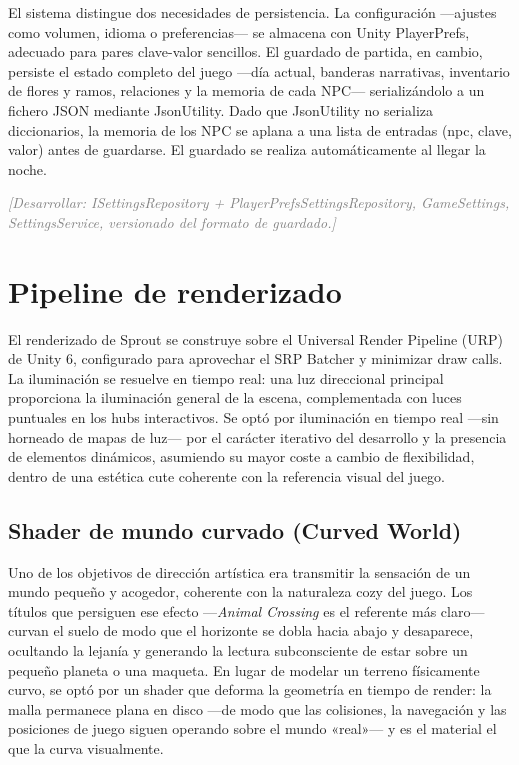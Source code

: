 \documentclass[12pt,twoside,titlepage]{report}
\begin{document}
El sistema distingue dos necesidades de persistencia. La configuración ---ajustes como volumen, idioma o preferencias--- se almacena con Unity PlayerPrefs, adecuado para pares clave-valor sencillos. El guardado de partida, en cambio, persiste el estado completo del juego ---día actual, banderas narrativas, inventario de flores y ramos, relaciones y la memoria de cada NPC--- serializándolo a un fichero JSON mediante JsonUtility. Dado que JsonUtility no serializa diccionarios, la memoria de los NPC se aplana a una lista de entradas (npc, clave, valor) antes de guardarse. El guardado se realiza automáticamente al llegar la noche.

\textcolor{gray}{\textit{[Desarrollar: ISettingsRepository + PlayerPrefsSettingsRepository, GameSettings, SettingsService, versionado del formato de guardado.]}}

\section{Pipeline de renderizado}

El renderizado de Sprout se construye sobre el Universal Render Pipeline (URP) de Unity 6, configurado para aprovechar el SRP Batcher y minimizar draw calls. La iluminación se resuelve en tiempo real: una luz direccional principal proporciona la iluminación general de la escena, complementada con luces puntuales en los hubs interactivos. Se optó por iluminación en tiempo real ---sin horneado de mapas de luz--- por el carácter iterativo del desarrollo y la presencia de elementos dinámicos, asumiendo su mayor coste a cambio de flexibilidad, dentro de una estética cute coherente con la referencia visual del juego.

\subsection{Shader de mundo curvado (Curved World)}

Uno de los objetivos de dirección artística era transmitir la sensación de un mundo pequeño y acogedor, coherente con la naturaleza cozy del juego. Los títulos que persiguen ese efecto ---\textit{Animal Crossing} es el referente más claro--- curvan el suelo de modo que el horizonte se dobla hacia abajo y desaparece, ocultando la lejanía y generando la lectura subconsciente de estar sobre un pequeño planeta o una maqueta. En lugar de modelar un terreno físicamente curvo, se optó por un shader que deforma la geometría en tiempo de render: la malla permanece plana en disco ---de modo que las colisiones, la navegación y las posiciones de juego siguen operando sobre el mundo «real»--- y es el material el que la curva visualmente.
\end{document}

